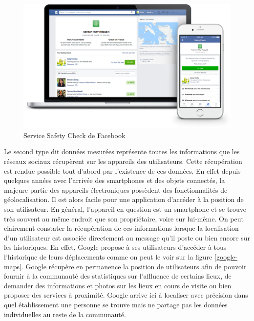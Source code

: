 \begin{figure}[H]
    \centering
    \includegraphics[width=\textwidth]{./img/safetycheck.png}
    \caption{Service Safety Check de Facebook}
    \label{safety-check}
\end{figure}

Le second type dit données mesurées représente toutes les informations que les réseaux sociaux récupèrent sur les appareils des utilisateurs. Cette récupération est rendue possible tout d’abord par l’existence de ces données. En effet depuis quelques années avec l’arrivée des smartphones et des objets connectés, la majeure partie des appareils électroniques possèdent des fonctionnalités de géolocalisation. Il est alors facile pour une application d’accéder à la position de son utilisateur. En général, l’appareil en question est un smartphone et se trouve très souvent au même endroit que son propriétaire, voire sur lui-même. On peut clairement constater la récupération de ces informations lorsque la localisation d’un utilisateur est associée directement au message qu’il poste ou bien encore sur les historiques. En effet, Google propose à ses utilisateurs d’accéder à tous l’historique de leurs déplacements comme on peut le voir sur la figure \ref{google-maps}. Google récupère en permanence la position de utilisateurs afin de pouvoir fournir à la communauté des statistiques sur l’affluence de certains lieux, de demander des informations et photos sur les lieux en cours de visite ou bien proposer des services à proximité. Google arrive ici à localiser avec précision dans quel établissement une personne se trouve mais ne partage pas les données individuelles au reste de la communauté.

